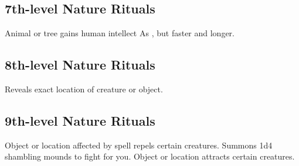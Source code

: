 \subsection{7th-level Nature Rituals}
\begin{rituallist}
     Animal or tree gains human intellect
     As , but faster and longer.
\end{rituallist}

\subsection{8th-level Nature Rituals}
\begin{rituallist}
     Reveals exact location of creature or object.
\end{rituallist}

\subsection{9th-level Nature Rituals}
\begin{rituallist}
     Object or location affected by spell repels certain creatures.
     Summons 1d4 shambling mounds to fight for you.
     Object or location attracts certain creatures.
\end{rituallist}

